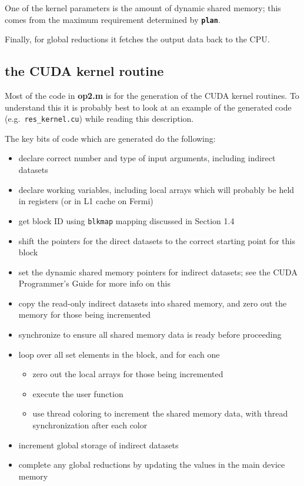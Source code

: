 \documentclass[12pt]{article}
\begin{document}
One of the kernel parameters is the amount of dynamic shared 
memory; this comes from the maximum requirement determined 
by {\tt \bf plan}.

Finally, for global reductions it fetches the output data back
to the CPU.

\newpage

\subsection{the CUDA kernel routine}

Most of the code in {\bf op2.m} is for the generation of the CUDA 
kernel routines.  To understand this it is probably best to look
at an example of the generated code (e.g.~{\tt res\_kernel.cu})
while reading this description.

The key bits of code which are generated do the following:
\begin{itemize}
\item
declare correct number and type of input arguments, including
indirect datasets

\item
declare working variables, including local arrays which will probably
be held in registers (or in L1 cache on Fermi)

\item
get block ID using {\tt blkmap} mapping discussed in Section 1.4

\item
shift the pointers for the direct datasets to the correct starting 
point for this block

\item
set the dynamic shared memory pointers for indirect datasets; see 
the CUDA Programmer's Guide for more info on this

\item
copy the read-only indirect datasets into shared memory, 
and zero out the memory for those being incremented

\item
synchronize to ensure all shared memory data is ready before proceeding

\item
loop over all set elements in the block, and for each one
 \begin{itemize}
 \item zero out the local arrays for those being incremented
 \item execute the user function
 \item use thread coloring to increment the shared memory data,
       with thread synchronization after each color
 \end{itemize}

\item
increment global storage of indirect datasets 

\item
complete any global reductions by updating the values in the main device 
memory

\end{itemize}
\end{document}
